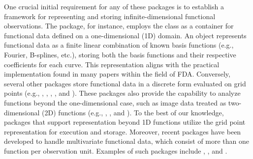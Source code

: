One crucial initial requirement for any of these packages is to establish a framework for representing and storing infinite-dimensional functional observations. The  package, for instance, employs the  class as a container for functional data defined on a one-dimensional (1D) domain. An  object represents functional data as a finite linear combination of known basis functions (e.g., Fourier, B-splines, etc.), storing both the basis functions and their respective coefficients for each curve. This representation aligns with the practical implementation found in many papers within the field of FDA. Conversely, several other  packages store functional data in a discrete form evaluated on grid points (e.g., , , , , and ). These packages also provide the capability to analyze functions beyond the one-dimensional case, such as image data treated as two-dimensional (2D) functions (e.g., , , and ). To the best of our knowledge, packages that support representation beyond 1D functions utilize the grid point representation for execution and storage.
Moreover, recent packages have been developed to handle multivariate functional data, which consist of more than one function per observation unit. Examples of such packages include , , and .

